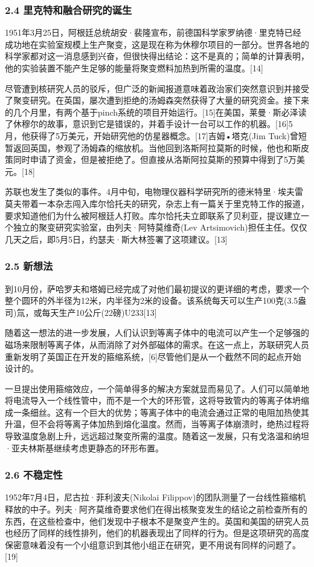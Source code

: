 \subsubsection{2.4 里克特和融合研究的诞生}
1951年3月25日，阿根廷总统胡安·裴隆宣布，前德国科学家罗纳德·里克特已经成功地在实验室规模上生产聚变，这是现在称为休穆尔项目的一部分。世界各地的科学家都对这一消息感到兴奋，但很快得出结论：这不是真的；简单的计算表明，他的实验装置不能产生足够的能量将聚变燃料加热到所需的温度。[14]

尽管遭到核研究人员的驳斥，但广泛的新闻报道意味着政治家们突然意识到并接受了聚变研究。在英国，屡次遭到拒绝的汤姆森突然获得了大量的研究资金。接下来的几个月里，有两个基于pinch系统的项目开始运行。[15]在美国，莱曼·斯必泽读了休穆尔的故事，意识到它是错误的，并着手设计一台可以工作的机器。[16]5月，他获得了5万美元，开始研究他的仿星器概念。[17]吉姆•塔克(Jim Tuck)曾短暂返回英国，参观了汤姆森的缩放机。当他回到洛斯阿拉莫斯的时候，他也和斯皮策同时申请了资金，但是被拒绝了。但直接从洛斯阿拉莫斯的预算中得到了5万美元。[18]

苏联也发生了类似的事件。4月中旬，电物理仪器科学研究所的德米特里·埃夫雷莫夫带着一本杂志闯入库尔恰托夫的研究，杂志上有一篇关于里克特工作的报道，要求知道他们为什么被阿根廷人打败。库尔恰托夫立即联系了贝利亚，提议建立一个独立的聚变研究实验室，由列夫·阿特莫维奇(Lev Artsimovich)担任主任。仅仅几天之后，即5月5日，约瑟夫·斯大林签署了这项建议。[13]
\subsubsection{2.5 新想法}
到10月份，萨哈罗夫和塔姆已经完成了对他们最初提议的更详细的考虑，要求一个整个圆环的外半径为12米，内半径为2米的设备。该系统每天可以生产100克(3.5盎司)氚，或每天生产10公斤(22磅)U233[13]

随着这一想法的进一步发展，人们认识到等离子体中的电流可以产生一个足够强的磁场来限制等离子体，从而消除了对外部磁体的需求。在这一点上，苏联研究人员重新发明了英国正在开发的箍缩系统，[6]尽管他们是从一个截然不同的起点开始设计的。

一旦提出使用箍缩效应，一个简单得多的解决方案就显而易见了。人们可以简单地将电流导入一个线性管中，而不是一个大的环形管，这将导致管内的等离子体坍缩成一条细丝。这有一个巨大的优势；等离子体中的电流会通过正常的电阻加热使其升温，但不会将等离子体加热到熔化温度。然而，当等离子体崩溃时，绝热过程将导致温度急剧上升，远远超过聚变所需的温度。随着这一发展，只有戈洛温和纳坦·亚夫林斯基继续考虑更静态的环形布置。
\subsubsection{2.6 不稳定性}
1952年7月4日，尼古拉·菲利波夫(Nikolai Filippov)的团队测量了一台线性箍缩机释放的中子。列夫·阿齐莫维奇要求他们在得出核聚变发生的结论之前检查所有的东西，在这些检查中，他们发现中子根本不是聚变产生的。英国和美国的研究人员也经历了同样的线性排列，他们的机器表现出了同样的行为。但是这项研究的高度保密意味着没有一个小组意识到其他小组正在研究，更不用说有同样的问题了。[19]

